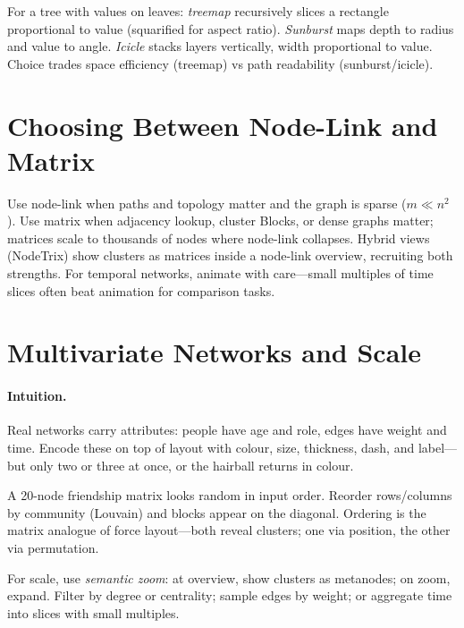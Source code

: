 \begin{definition}\label{def:hierarchy}
For a tree with values on leaves: \emph{treemap} recursively slices a rectangle proportional to value (squarified for aspect ratio). \emph{Sunburst} maps depth to radius and value to angle. \emph{Icicle} stacks layers vertically, width proportional to value. Choice trades space efficiency (treemap) vs path readability (sunburst/icicle).
\end{definition}

\section{Choosing Between Node-Link and Matrix}
\label{sec:choose-enc}
Use node-link when paths and topology matter and the graph is sparse ($m\ll n^2$). Use matrix when adjacency lookup, cluster Blocks, or dense graphs matter; matrices scale to thousands of nodes where node-link collapses. Hybrid views (NodeTrix) show clusters as matrices inside a node-link overview, recruiting both strengths. For temporal networks, animate with care---small multiples of time slices often beat animation for comparison tasks.

\section{Multivariate Networks and Scale}
\label{sec:multivariate}
\paragraph{Intuition.} Real networks carry attributes: people have age and role, edges have weight and time. Encode these on top of layout with colour, size, thickness, dash, and label---but only two or three at once, or the hairball returns in colour.

\begin{example}\label{ex:matrix-order}
A 20-node friendship matrix looks random in input order. Reorder rows/columns by community (Louvain) and blocks appear on the diagonal. Ordering is the matrix analogue of force layout---both reveal clusters; one via position, the other via permutation.
\end{example}

For scale, use \emph{semantic zoom}: at overview, show clusters as metanodes; on zoom, expand. Filter by degree or centrality; sample edges by weight; or aggregate time into slices with small multiples.

